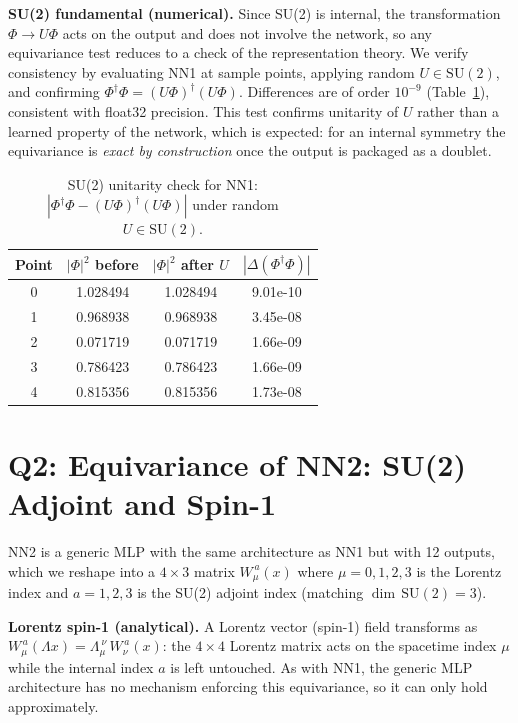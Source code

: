 \documentclass[10pt,leqno]{amsart}
\begin{document}
\textbf{SU(2) fundamental (numerical).}
Since SU(2) is internal, the transformation $\Phi \to U\Phi$ acts on the
output and does not involve the network, so any equivariance test reduces
to a check of the representation theory. We verify consistency by
evaluating NN1 at sample points, applying random $U \in \mathrm{SU}(2)$,
and confirming $\Phi^\dagger\Phi = (U\Phi)^\dagger(U\Phi)$. Differences
are of order $10^{-9}$ (Table~\ref{tab:q1_su2}), consistent with float32
precision. This test confirms unitarity of $U$ rather than a learned
property of the network, which is expected: for an internal symmetry the
equivariance is \emph{exact by construction} once the output is packaged
as a doublet.

\begin{table}[h]
    \centering
    \caption{SU(2) unitarity check for NN1: $|\Phi^\dagger\Phi - (U\Phi)^\dagger(U\Phi)|$
    under random $U \in \mathrm{SU}(2)$.}
    \label{tab:q1_su2}
    \begin{tabular}{cccc}
    Point & $|\Phi|^2$ before & $|\Phi|^2$ after $U$ & $|\Delta(\Phi^\dagger\Phi)|$ \\
    \hline
    0 & 1.028494 & 1.028494 & 9.01e-10 \\
    1 & 0.968938 & 0.968938 & 3.45e-08 \\
    2 & 0.071719 & 0.071719 & 1.66e-09 \\
    3 & 0.786423 & 0.786423 & 1.66e-09 \\
    4 & 0.815356 & 0.815356 & 1.73e-08
    \end{tabular}
\end{table}

\section{Q2: Equivariance of NN2: SU(2) Adjoint and Spin-1}

NN2 is a generic MLP with the same architecture as NN1 but with 12 outputs,
which we reshape into a $4 \times 3$ matrix $W_\mu^{\,a}(x)$ where
$\mu = 0,1,2,3$ is the Lorentz index and $a = 1,2,3$ is the SU(2)
adjoint index (matching $\dim\,\mathrm{SU}(2) = 3$).

\textbf{Lorentz spin-1 (analytical).}
A Lorentz vector (spin-1) field transforms as
$W_\mu^{\,a}(\Lambda x) = \Lambda_\mu^{\ \nu}\,W_\nu^{\,a}(x)$:
the $4 \times 4$ Lorentz matrix acts on the spacetime index $\mu$ while
the internal index $a$ is left untouched. As with NN1, the generic MLP
architecture has no mechanism enforcing this equivariance, so it can only
hold approximately.
\end{document}
